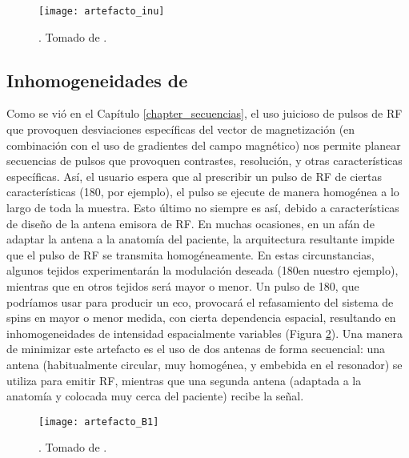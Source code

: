 \begin{figure}[htb]
 \begin{figg}
   \texttt{[image: artefacto\_inu]}
   \caption{\figurapendiente. Tomado de \cite{vovk_pernus_likar_2007}.}
 \label{fig:artefacto_inu}
 \end{figg}
\end{figure}




\subsection{Inhomogeneidades de \Bone}
Como se vió en el Capítulo \ref{chapter_secuencias}, el uso juicioso de pulsos de RF que provoquen desviaciones específicas del vector de magnetización (en combinación con el uso de gradientes del campo magnético) nos permite planear secuencias de pulsos que provoquen contrastes, resolución, y otras características específicas. Así, el usuario espera que al prescribir un pulso de RF de ciertas características (180\degrees, por ejemplo), el pulso se ejecute de manera homogénea a lo largo de toda la muestra. Esto último no siempre es así, debido a características de diseño de la antena emisora de RF. En muchas ocasiones, en un afán de adaptar la antena a la anatomía del paciente, la arquitectura resultante impide que el pulso de RF se transmita homogéneamente. En estas circunstancias, algunos tejidos experimentarán la modulación deseada (180\degrees en nuestro ejemplo), mientras que en otros tejidos será mayor o menor. Un pulso de 180\degrees, que podríamos usar para producir un eco, provocará el refasamiento del sistema de spins en mayor o menor medida, con cierta dependencia espacial, resultando en inhomogeneidades de intensidad espacialmente variables (Figura \ref{fig:artefacto_B1}). Una manera de minimizar este artefacto es el uso de dos antenas de forma secuencial: una antena (habitualmente circular, muy homogénea, y embebida en el resonador) se utiliza para emitir RF, mientras que una segunda antena (adaptada a la anatomía y colocada muy cerca del paciente) recibe la señal.


\begin{figure}[htb]
 \begin{figg}
   \texttt{[image: artefacto\_B1]}
   \caption{\figurapendiente. Tomado de \cite{wu2014mitigating}.}
 \label{fig:artefacto_B1}
 \end{figg}
\end{figure}


